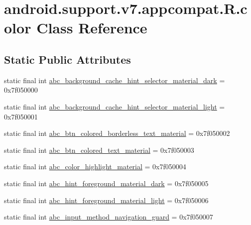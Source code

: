 \hypertarget{classandroid_1_1support_1_1v7_1_1appcompat_1_1R_1_1color}{}\section{android.\+support.\+v7.\+appcompat.\+R.\+color Class Reference}
\label{classandroid_1_1support_1_1v7_1_1appcompat_1_1R_1_1color}
\subsection*{Static Public Attributes}
\begin{DoxyCompactItemize}
\item 
static final int \mbox{\hyperlink{classandroid_1_1support_1_1v7_1_1appcompat_1_1R_1_1color_a45abf46d211e98947a1719ec5c2e62e9}{abc\+\_\+background\+\_\+cache\+\_\+hint\+\_\+selector\+\_\+material\+\_\+dark}} = 0x7f050000
\item 
static final int \mbox{\hyperlink{classandroid_1_1support_1_1v7_1_1appcompat_1_1R_1_1color_a7e19f3cbb99fc8d4205b7fafdb513fc8}{abc\+\_\+background\+\_\+cache\+\_\+hint\+\_\+selector\+\_\+material\+\_\+light}} = 0x7f050001
\item 
static final int \mbox{\hyperlink{classandroid_1_1support_1_1v7_1_1appcompat_1_1R_1_1color_acefd1cd8f6a21577e1ee83c0f500b032}{abc\+\_\+btn\+\_\+colored\+\_\+borderless\+\_\+text\+\_\+material}} = 0x7f050002
\item 
static final int \mbox{\hyperlink{classandroid_1_1support_1_1v7_1_1appcompat_1_1R_1_1color_af77cfaceff758c1bd874374593a64be6}{abc\+\_\+btn\+\_\+colored\+\_\+text\+\_\+material}} = 0x7f050003
\item 
static final int \mbox{\hyperlink{classandroid_1_1support_1_1v7_1_1appcompat_1_1R_1_1color_ac136ab6cd85c7e58fd679a2653eaa58a}{abc\+\_\+color\+\_\+highlight\+\_\+material}} = 0x7f050004
\item 
static final int \mbox{\hyperlink{classandroid_1_1support_1_1v7_1_1appcompat_1_1R_1_1color_ab3fa0960569289bcb05cdc34ced2bdf3}{abc\+\_\+hint\+\_\+foreground\+\_\+material\+\_\+dark}} = 0x7f050005
\item 
static final int \mbox{\hyperlink{classandroid_1_1support_1_1v7_1_1appcompat_1_1R_1_1color_aa81ae0641c6229a90e8b381f2672d731}{abc\+\_\+hint\+\_\+foreground\+\_\+material\+\_\+light}} = 0x7f050006
\item 
static final int \mbox{\hyperlink{classandroid_1_1support_1_1v7_1_1appcompat_1_1R_1_1color_a2b65b695a4c6070b98956b74e00d5f37}{abc\+\_\+input\+\_\+method\+\_\+navigation\+\_\+guard}} = 0x7f050007

\end{DoxyCompactItemize}
